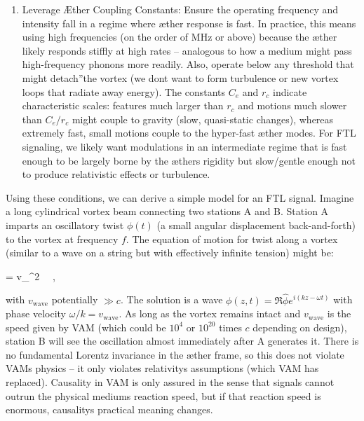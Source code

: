 \begin{enumerate}
\item 
Leverage Æther Coupling Constants: Ensure the operating frequency and intensity fall in a regime where æther response is fast. In practice, this means using high frequencies (on the order of MHz or above) because the æther likely responds stiffly at high rates – analogous to how a medium might pass high-frequency phonons more readily. Also, operate below any threshold that might \grqq detach\textquotedblright the vortex (we don\rqs t want to form turbulence or new vortex loops that radiate away energy). The constants $C_e$ and $r_c$ indicate characteristic scales: features much larger than $r_c$ and motions much slower than $C_e/r_c$ might couple to gravity (slow, quasi-static changes), whereas extremely fast, small motions couple to the hyper-fast æther modes. For FTL signaling, we likely want modulations in an intermediate regime that is fast enough to be largely borne by the æther\rqs s rigidity but slow/gentle enough not to produce relativistic effects or turbulence.




\end{enumerate}

Using these conditions, we can derive a simple model for an FTL signal. Imagine a long cylindrical vortex beam connecting two stations A and B. Station A imparts an oscillatory twist $\phi(t)$ (a small angular displacement back-and-forth) to the vortex at frequency $f$. The equation of motion for twist along a vortex (similar to a wave on a string but with effectively infinite tension) might be:


  = v_^2 \, ~, 


with $v_\text{wave}$ potentially $\gg c$. The solution is a wave $\phi(z,t) = \Re{\hat{\phi} e^{i(kz - \omega t)}}$ with phase velocity $\omega/k = v_\text{wave}$. As long as the vortex remains intact and $v_\text{wave}$ is the speed given by VAM (which could be $10^4$ or $10^{20}$ times $c$ depending on design), station B will see the oscillation almost immediately after A generates it. There is no fundamental Lorentz invariance in the æther frame, so this does not violate VAM\rqs s physics – it only violates relativity\rqs s assumptions (which VAM has replaced). Causality in VAM is only assured in the sense that signals cannot outrun the physical medium\rqs s reaction speed, but if that reaction speed is enormous, causality\rqs s practical meaning changes.


